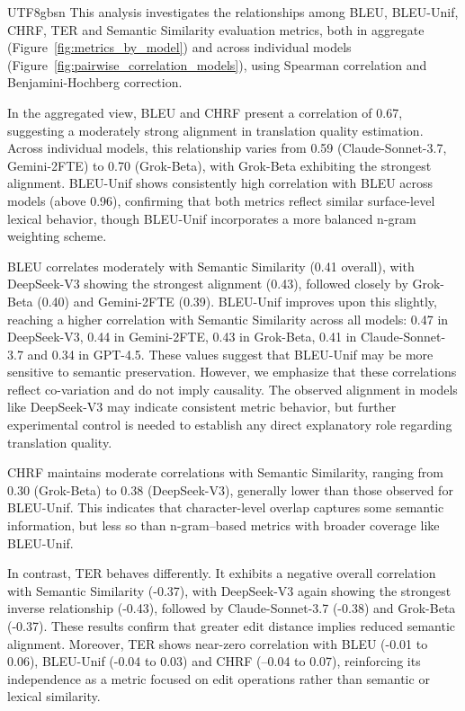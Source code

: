 \documentclass[conference]{IEEEtran}
\begin{document}
\begin{CJK}{UTF8}{gbsn}
This analysis investigates the relationships among BLEU, BLEU-Unif, CHRF, TER and Semantic Similarity evaluation metrics, both in aggregate (Figure~\ref{fig:metrics_by_model}) and across individual models (Figure~\ref{fig:pairwise_correlation_models}), using Spearman correlation and Benjamini-Hochberg correction.

In the aggregated view, BLEU and CHRF present a correlation of 0.67, suggesting a moderately strong alignment in translation quality estimation. Across individual models, this relationship varies from 0.59 (Claude-Sonnet-3.7, Gemini-2FTE) to 0.70 (Grok-Beta), with Grok-Beta exhibiting the strongest alignment. BLEU-Unif shows consistently high correlation with BLEU across models (above 0.96), confirming that both metrics reflect similar surface-level lexical behavior, though BLEU-Unif incorporates a more balanced n-gram weighting scheme.

BLEU correlates moderately with Semantic Similarity (0.41 overall), with DeepSeek-V3 showing the strongest alignment (0.43), followed closely by Grok-Beta (0.40) and Gemini-2FTE (0.39). BLEU-Unif improves upon this slightly, reaching a higher correlation with Semantic Similarity across all models: 0.47 in DeepSeek-V3, 0.44 in Gemini-2FTE, 0.43 in Grok-Beta, 0.41 in Claude-Sonnet-3.7 and 0.34 in GPT-4.5. These values suggest that BLEU-Unif may be more sensitive to semantic preservation. However, we emphasize that these correlations reflect co-variation and do not imply causality. The observed alignment in models like DeepSeek-V3 may indicate consistent metric behavior, but further experimental control is needed to establish any direct explanatory role regarding translation quality.


CHRF maintains moderate correlations with Semantic Similarity, ranging from 0.30 (Grok-Beta) to 0.38 (DeepSeek-V3), generally lower than those observed for BLEU-Unif. This indicates that character-level overlap captures some semantic information, but less so than n-gram–based metrics with broader coverage like BLEU-Unif.

In contrast, TER behaves differently. It exhibits a negative overall correlation with Semantic Similarity (-0.37), with DeepSeek-V3 again showing the strongest inverse relationship (-0.43), followed by Claude-Sonnet-3.7 (-0.38) and Grok-Beta (-0.37). These results confirm that greater edit distance implies reduced semantic alignment. Moreover, TER shows near-zero correlation with BLEU (-0.01 to 0.06), BLEU-Unif (-0.04 to 0.03) and CHRF (–0.04 to 0.07), reinforcing its independence as a metric focused on edit operations rather than semantic or lexical similarity.


\end{CJK}
\end{document}
